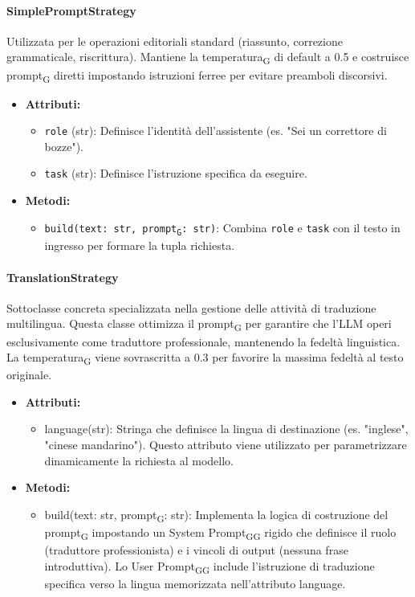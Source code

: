 \documentclass[11pt,a4paper]{article}
\newcommand{\gls}[1]{#1\textsubscript{G}}
\begin{document}
\paragraph{SimplePromptStrategy}
Utilizzata per le operazioni editoriali standard (riassunto, correzione grammaticale, riscrittura). Mantiene la \gls{temperatura} di default a 0.5 e costruisce \gls{prompt} diretti impostando istruzioni ferree per evitare preamboli discorsivi.
\begin{itemize}
    \item\textbf{Attributi:}
\begin{itemize}
    \item \texttt{role} (str): Definisce l'identità dell'assistente (es. "Sei un correttore di bozze").
    \item \texttt{task} (str): Definisce l'istruzione specifica da eseguire.
\end{itemize}
    \item\textbf{Metodi:}
\begin{itemize}
    \item \texttt{build(text: str, \gls{prompt}: str)}: Combina \texttt{role} e \texttt{task} con il testo in ingresso per formare la tupla richiesta.
\end{itemize}
\end{itemize}

\paragraph{TranslationStrategy} 
Sottoclasse concreta specializzata nella gestione delle attività di traduzione multilingua. Questa classe ottimizza il \gls{prompt} per garantire che l'LLM operi esclusivamente come traduttore professionale, mantenendo la fedeltà linguistica. La \gls{temperatura} viene sovrascritta a 0.3 per favorire la massima fedeltà al testo originale.
\begin{itemize}
    \item \textbf{Attributi:}
\begin{itemize}
    \item language(str): Stringa che definisce la lingua di destinazione (es. "inglese", "cinese mandarino"). Questo attributo viene utilizzato per parametrizzare dinamicamente la richiesta al modello.
\end{itemize}
\item \textbf{Metodi:}
\begin{itemize}
    \item build(text: str, \gls{prompt}: str): Implementa la logica di costruzione del \gls{prompt} impostando un \gls{System \gls{Prompt}} rigido che definisce il ruolo (traduttore professionista) e i vincoli di output (nessuna frase introduttiva). Lo \gls{User \gls{Prompt}} include l'istruzione di traduzione specifica verso la lingua memorizzata nell'attributo language.
\end{itemize}
\end{itemize}
\end{document}
